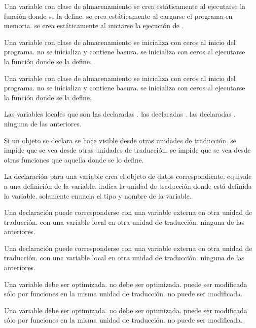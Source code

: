 \question Una variable con clase de almacenamiento  
\choice se crea estáticamente al ejecutarse la función donde se la define.
\correctchoice se crea estáticamente al cargarse el programa en memoria.
\choice se crea estáticamente al iniciarse la ejecución de .

\question Una variable con clase de almacenamiento  
\correctchoice se inicializa con ceros al inicio del programa.
\choice no se inicializa y contiene basura.
\choice se inicializa con ceros al ejecutarse la función donde se la define.

\question Una variable con clase de almacenamiento 
\choice se inicializa con ceros al inicio del programa.
\correctchoice no se inicializa y contiene basura.
\choice se inicializa con ceros al ejecutarse la función donde se la define.

\question Las variables locales que  son
\choice las declaradas .
\correctchoice las declaradas .
\choice las declaradas .
\choice ninguna de las anteriores.

\question Si un objeto se declara 
\choice se hace visible desde otras unidades de traducción.
\correctchoice se impide que se vea desde otras unidades de traducción.
\choice se impide que se vea desde otras funciones que aquella donde se lo define.

\question La declaración  para una variable
\choice crea el objeto de datos correspondiente.
\choice equivale a una definición de la variable.
\choice indica la unidad de traducción donde está definida la variable.
\correctchoice solamente enuncia el tipo y nombre de la variable.

\question Una declaración  puede corresponderse
\correctchoice con una variable externa en otra unidad de traducción.
\choice con una variable local en otra unidad de traducción.
\choice ninguna de las anteriores.

\question Una declaración  puede corresponderse
\choice con una variable externa en otra unidad de traducción.
\choice con una variable local en otra unidad de traducción.
\correctchoice ninguna de las anteriores.

\question Una variable  
\choice debe ser optimizada.
\choice no debe ser optimizada.
\choice puede ser modificada sólo por funciones en la misma unidad de traducción.
\correctchoice no puede ser modificada.

\question Una variable  
\choice debe ser optimizada.
\correctchoice no debe ser optimizada.
\choice puede ser modificada sólo por funciones en la misma unidad de traducción.
\choice no puede ser modificada.
